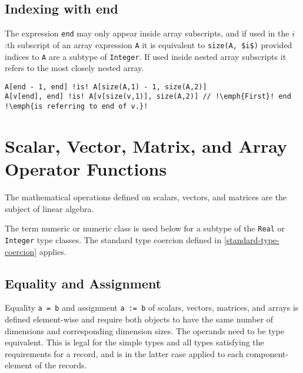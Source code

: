 \subsection{Indexing with end}

The expression \lstinline!end! may only appear inside array subscripts, and if used in the $i$:th subscript of an array expression \lstinline!A! it is equivalent
to \lstinline!size(A, $i$)! provided indices to \lstinline!A! are a subtype of \lstinline!Integer!.  If used inside nested array subscripts it refers
to the most closely nested array.

\begin{example}
\begin{lstlisting}[language=modelica, escapechar=!]
A[end - 1, end] !is! A[size(A,1) - 1, size(A,2)]
A[v[end], end] !is! A[v[size(v,1)], size(A,2)] // !\emph{First}! end !\emph{is referring to end of v.}!
\end{lstlisting}
\end{example}

\section{Scalar, Vector, Matrix, and Array Operator Functions}

The mathematical operations defined on scalars, vectors, and matrices are the subject of linear algebra.

The term numeric or numeric class is used below for a subtype of the \lstinline!Real! or \lstinline!Integer! type classes.  The standard type coercion defined
in \autoref{standard-type-coercion} applies.

\subsection{Equality and Assignment}

Equality \lstinline!a = b! and assignment \lstinline!a := b! of scalars, vectors, matrices, and
arrays is defined element-wise and require both objects to have the same
number of dimensions and corresponding dimension sizes. The operands
need to be type equivalent. This is legal for the simple types and all
types satisfying the requirements for a record, and is in the latter
case applied to each component-element of the records.

